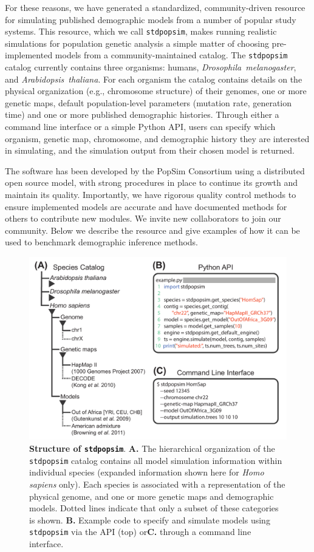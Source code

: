 \documentclass[12pt,halfline,a4paper]{ouparticle}
\newcommand{\stdpopsim}{\texttt{stdpopsim}\xspace}
\begin{document}
For these reasons, we have generated a standardized, community-driven resource
for simulating published demographic models from a number of popular study systems.
This resource, which we call \stdpopsim, makes running
realistic simulations for population genetic analysis a simple matter of
choosing pre-implemented models from a community-maintained catalog.
The \stdpopsim catalog currently contains three organisms: humans,
\emph{Drosophila~melanogaster}, and \emph{Arabidopsis~thaliana}. For each
organism the catalog contains details on the physical organization (e.g., chromosome structure)
of their genomes, one or more genetic maps, default population-level parameters (mutation rate,
generation time) and one or more published demographic histories. Through
either a command line interface or a simple Python API, users can specify which
organism, genetic map, chromosome, and demographic history they are interested in simulating, and the
simulation output from their chosen model is returned.

The software has been developed by the PopSim Consortium using a
distributed open source model, with strong procedures in place
to continue its growth and maintain its quality.
Importantly, we have rigorous quality control methods to ensure implemented models are accurate
and have documented methods for others to contribute new modules.
We invite new collaborators to join our community.
Below we describe the resource and give
examples of how it can be used to benchmark demographic inference methods.

\begin{figure}[t]
\begin{center}
\includegraphics[width=0.7\linewidth]{display_items/Figure1.pdf}
\caption{\textbf{Structure of \stdpopsim}. \textbf{A.} The
hierarchical organization of the \stdpopsim catalog contains all model simulation information
within individual species (expanded information shown here for \emph{Homo sapiens} only). 
Each species is associated with a representation of the physical genome, and one or more genetic maps and demographic models.
Dotted lines indicate that only a subset of these categories is shown. \textbf{B.} Example code to specify
and simulate models using \stdpopsim via the API (top) or\textbf{C.} through a command line interface.}
\label{fig:cartoon}
\end{center}
\end{figure}
\end{document}
